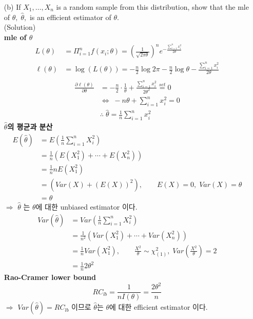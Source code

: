 \documentclass{oblivoir}
\newcommand{\flr}[1]{\left ( #1 \right )}
\newcommand{\blue}[1]{{\color{blue} #1}}
\begin{document}
\begin{enumerate}
\begin{enumerate}
\vspace{3mm}
\item[(b)]
If $X_1, \ldots, X_n$ is a random sample from this distribution, show that the mle of $\theta, \; \hat\theta,$
is an efficient estimator of $\theta$. \\
\blue{(Solution)} \\
\textbf{mle of $\theta$}
\begin{align*}
L(\theta) &=  \Pi_{i=1}^n f(x_i ;\theta) = \flr{\frac{1}{\sqrt{2\pi\theta}}}^n e^{-\frac{\sum_{i=1}^n x_i^2}{2\theta}} \\
\ell(\theta) &= \log(L(\theta)) = -\frac{n}{2} \log 2\pi -\frac{n}{2} \log \theta - \frac{\sum_{i=1}^n x_i^2}{2\theta} \\
\end{align*}
\begin{align*}
\frac{\partial \ell(\theta)}{\partial \theta} &= -\frac{n}{2}\cdot\frac{1}{\theta} + \frac{\sum_{i=1}^n x_i^2}{2\theta^2}
\overset{set}{=} 0 \\
&\Leftrightarrow \; -n\theta + \sum_{i=1}^n x_i^2 = 0 \\
&\therefore \; \hat\theta = \frac{1}{n} \sum_{i=1}^n x_i^2
\end{align*}
\textbf{$\hat\theta$의 평균과 분산}
\begin{align*}
E(\hat\theta) &= E\flr{\frac{1}{n} \sum_{i=1}^n X_i^2} \\
&= \frac{1}{n} (E(X_1^2) + \cdots + E(X_n^2)) \\
&= \frac{1}{n} n E(X_1^2) \\
&= (Var(X) + (E(X))^2), \qquad E(X) = 0, \; Var(X) = \theta  \\
&=  \theta 
\end{align*}
$\Rightarrow$ $\hat\theta$ 는 $\theta$에 대한 unbiased estimator 이다. \\
\begin{align*}
Var(\hat\theta) &= Var\flr{\frac{1}{n} \sum_{i=1}^n X_i^2} \\
&= \frac{1}{n^2} (Var(X_1^2) + \cdots + Var(X_n^2)) \\
&= \frac{1}{n} Var(X_1^2), \qquad \frac{X^2}{\theta} \sim \chi^2_{(1)}, \; Var\flr{\frac{X^2}{\theta}} = 2 \\
&= \frac{1}{n} 2\theta^2 
\end{align*}
\textbf{Rao-Cramer lower bound} 
$$
RC_{lb} = \frac{1}{nI(\theta)} = \frac{2\theta^2}{n}
$$
$\Rightarrow$ $Var(\hat\theta) = RC_{lb}$ 이므로 $\hat\theta$는 $\theta$에 대한 efficient estimator 이다.


\end{enumerate}
\end{enumerate}
\end{document}
